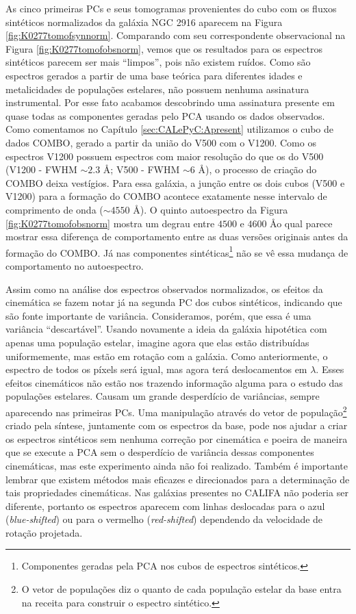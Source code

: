 As cinco primeiras PCs e seus tomogramas provenientes do cubo com os fluxos sintéticos normalizados da galáxia NGC 2916
aparecem na Figura \ref{fig:K0277tomofsynnorm}. Comparando com seu correspondente observacional na Figura
\ref{fig:K0277tomofobsnorm}, vemos que os resultados para os espectros sintéticos parecem ser mais ``limpos'', pois não
existem ruídos. Como são espectros gerados a partir de uma base teórica para diferentes idades e metalicidades de
populações estelares, não possuem nenhuma assinatura instrumental. Por esse fato acabamos descobrindo uma assinatura
presente em quase todas as componentes geradas pelo PCA usando os dados observados. Como comentamos no Capítulo
\ref{sec:CALePyC:Apresent} utilizamos o cubo de dados COMBO, gerado a partir da união do V500 com o V1200. Como os
espectros V1200 possuem espectros com maior resolução do que os do V500 (V1200 - FWHM $\sim 2.3$ \AA; V500 - FWHM $\sim
6$ \AA), o processo de criação do COMBO deixa vestígios. Para essa galáxia, a junção entre os dois cubos (V500 e V1200)
para a formação do COMBO acontece exatamente nesse intervalo de comprimento de onda ($\sim 4550$ \AA). O quinto
autoespectro da Figura \ref{fig:K0277tomofobsnorm} mostra um degrau entre $4500$ e $4600$ \AA o qual parece mostrar essa
diferença de comportamento entre as duas versões originais antes da formação do COMBO. Já nas componentes
sintéticas\footnote{Componentes geradas pela PCA nos cubos de espectros sintéticos.} não se vê essa mudança de
comportamento no autoespectro.

Assim como na análise dos espectros observados normalizados, os efeitos da cinemática se fazem notar já na segunda PC
dos cubos sintéticos, indicando que são fonte importante de variância. Consideramos, porém, que essa é uma variância
``descartável''. Usando novamente a ideia da galáxia hipotética com apenas uma população estelar, imagine agora que elas
estão distribuídas uniformemente, mas estão em rotação com a galáxia. Como anteriormente, o espectro de todos os píxels
será igual, mas agora terá deslocamentos em $\lambda$. Esses efeitos cinemáticos não estão nos trazendo informação
alguma para o estudo das populações estelares. Causam um grande desperdício de variâncias, sempre aparecendo nas
primeiras PCs. Uma manipulação através do vetor de população\footnote{O vetor de populações diz o quanto de cada
população estelar da base entra na receita para construir o espectro sintético.} criado pela síntese, juntamente com os
espectros da base, pode nos ajudar a criar os espectros sintéticos sem nenhuma correção por cinemática e poeira de
maneira que se execute a PCA sem o desperdício de variância dessas componentes cinemáticas, mas este experimento ainda
não foi realizado. Também é importante lembrar que existem métodos mais eficazes e direcionados para a determinação de
tais propriedades cinemáticas. Nas galáxias presentes no CALIFA não poderia ser diferente, portanto os espectros
aparecem com linhas deslocadas para o azul ({\em blue-shifted}) ou para o vermelho ({\em red-shifted}) dependendo da
velocidade de rotação projetada. 


